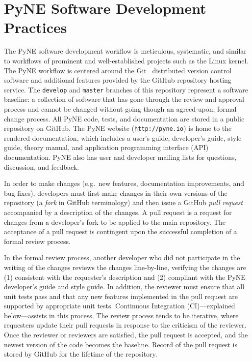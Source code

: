 \documentclass{anstrans}
\begin{document}
\section{PyNE Software Development Practices}

The PyNE software development workflow is meticulous, systematic, and similar
to workflows of prominent and well-established projects such as the Linux kernel.
The PyNE workflow is centered around the Git~\cite{git_2014} distributed version control software
and additional features provided by the GitHub repository hosting service.
The \texttt{develop} and \texttt{master} branches of this repository represent
a software baseline: a collection of software that has gone through the review and
approval process and cannot be changed without going though an agreed-upon, formal change process.
All PyNE code, tests, and documentation are stored in a public
repository on GitHub. The PyNE website (\texttt{http://pyne.io}) is home to the
rendered documentation, which includes a user's guide, developer's guide, style
guide, theory manual, and application programming interface (API) documentation.
PyNE also has user and developer mailing lists for questions, discussion, and feedback.

In order to make changes (e.g.\ new features, documentation improvements, and
bug fixes), developers must first make changes in their own versions of the
repository (a \emph{fork} in GitHub terminology) and then issue a GitHub \emph{pull
request} accompanied by a description of the changes. A pull request
is a request for changes from a developer's fork to be applied to the main
repository. The acceptance of a pull request is contingent upon the
successful completion of a formal review process.

In the formal review process, another developer who did not participate in the writing of the changes
reviews the changes line-by-line, verifying the changes are (1) consistent with
the requester's description and (2) compliant with the PyNE
developer's guide and style guide. In addition, the reviewer must
ensure that all unit tests pass and that
any new features implemented in the pull request are supported by appropriate unit
tests. Continuous Integration (CI)---explained below---assists in this process.
The review process tends to be iterative, where requesters update their pull
requests in response to the criticism of the reviewer. Once the reviewer or
reviewers are satisfied, the pull request is accepted, and the newest version of the
code becomes the baseline. Record of the pull request is stored by GitHub for the lifetime of the repository.
\end{document}
